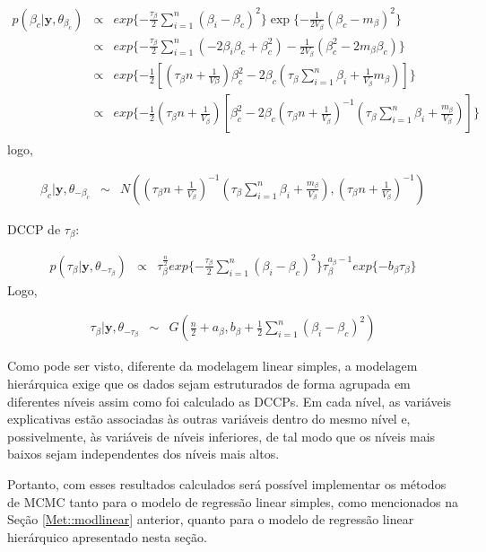 \documentclass[12pt,a4paper,header]{abnt}
\def\bs{\boldsymbol}
\begin{document}
\begin{eqnarray}
p(\beta_c | \bs{y}, \theta_{\beta_c}) &\propto& exp\{ -\frac{\tau_\beta}{2} \sum^n_{i=1} (\beta_i -\beta_c)^2  \} \exp\{ - \frac{1}{2V_\beta} (\beta_c-m_\beta)^2 \}
\\
%
&\propto& exp\{ -\frac{\tau_\beta}{2} \sum^n_{i=1} (-2\beta_i\beta_c + \beta_c^2) - \frac{1}{2V_\beta} (\beta_c^2-2m_\beta\beta_c) \} \\
%
&\propto& exp\{ -\frac{1}{2} [ (\tau_\beta n +\frac{1}{V\beta})\beta_c^2 - 2\beta_c (\tau_\beta \sum^n_{i=1}  \beta_i+\frac{1}{V_\beta}m_\beta) ]  \} \\
%
&\propto& exp\{ -\frac{1}{2} (\tau_\beta n +\frac{1}{V_\beta}) [ \beta_c^2 - 2\beta_c(\tau_\beta n +\frac{1}{V_\beta})^{-1}(\tau_\beta \sum^n_{i=1} \beta_i + \frac{m_\beta}{V_\beta} ) ]  \} \\
\end{eqnarray}
logo,

\begin{eqnarray}
\beta_c | \bs{y}, \theta_{-\beta_c}  &\sim& N( (\tau_\beta n +\frac{1}{V_\beta})^{-1}(\tau_\beta \sum^n_{i=1} \beta_i + \frac{m_\beta}{V_\beta} ),(\tau_\beta n +\frac{1}{V_\beta})^{-1}  )
\end{eqnarray}

\ac{DCCP} de $\tau_\beta$:

\begin{eqnarray}
p(\tau_\beta | \bs{y}, \theta_{-\tau_\beta} ) &\propto& \tau_\beta^\frac{n}{2} exp\{ - \frac{\tau_\beta}{2}  \sum^n_{i=1} (\beta_{i} -\beta_c)^2 \}  \tau_\beta^{a_\beta - 1} exp\{ -b_\beta \tau_\beta \}
\end{eqnarray}
Logo,

\begin{eqnarray}
\tau_\beta | \bs{y}, \theta_{-\tau_\beta}  &\sim& G(\frac{n}{2}+a_\beta , b_\beta + \frac{1}{2}\sum^n_{i=1} (\beta_i -\beta_c)^2 )
\end{eqnarray}

Como pode ser visto, diferente da modelagem linear simples, a modelagem hierárquica exige que os dados sejam estruturados de forma agrupada em diferentes níveis assim como foi calculado as \ac{DCCP}s. Em cada nível, as variáveis explicativas estão associadas às outras variáveis dentro do mesmo nível e, possivelmente, às variáveis de níveis inferiores, de tal modo que os níveis mais baixos sejam independentes dos níveis mais altos.

Portanto, com esses resultados calculados será possível implementar os métodos de \ac{MCMC} tanto para o modelo de regressão linear simples, como mencionados na Seção \ref{Met::modlinear} anterior, quanto para o modelo de regressão linear hierárquico apresentado nesta seção.
\end{document}
